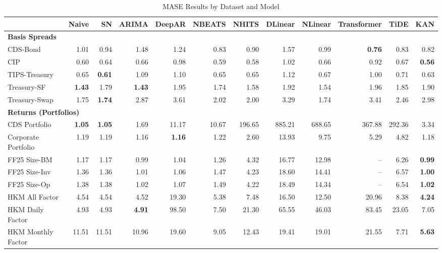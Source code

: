
\begin{table}[htbp]
\centering
\caption{MASE Results by Dataset and Model}
\label{tab:mase_results}
\scriptsize
\setlength{\tabcolsep}{1.5pt}
\renewcommand{\arraystretch}{0.9}
\begin{tabular}{@{}lrrrrrrrrrrr@{}}
\toprule
 & Naive & SN & ARIMA & DeepAR & NBEATS & NHITS & DLinear & NLinear & Transformer & TiDE & KAN \\
\midrule
\multicolumn{12}{l}{\textbf{Basis Spreads}} \\
CDS-Bond & 1.01 & 0.94 & 1.48 & 1.24 & 0.83 & 0.90 & 1.57 & 0.99 & \textbf{0.76} & 0.83 & 0.82 \\
CIP & 0.60 & 0.64 & 0.66 & 0.98 & 0.59 & 0.58 & 1.02 & 0.66 & 0.92 & 0.67 & \textbf{0.56} \\
TIPS-Treasury & 0.65 & \textbf{0.61} & 1.09 & 1.10 & 0.65 & 0.65 & 1.12 & 0.67 & 1.00 & 0.71 & 0.63 \\
Treasury-SF & \textbf{1.43} & 1.79 & \textbf{1.43} & 1.95 & 1.74 & 1.58 & 1.92 & 1.54 & 1.96 & 1.85 & 1.90 \\
Treasury-Swap & 1.75 & \textbf{1.74} & 2.87 & 3.61 & 2.02 & 2.00 & 3.29 & 1.74 & 3.41 & 2.46 & 2.98 \\
\midrule
\multicolumn{12}{l}{\textbf{Returns (Portfolios)}} \\
CDS Portfolio & \textbf{1.05} & \textbf{1.05} & 1.69 & 11.17 & 10.67 & 196.65 & 885.21 & 688.65 & 367.88 & 292.36 & 3.34 \\
Corporate Portfolio & 1.19 & 1.19 & 1.16 & \textbf{1.16} & 1.22 & 2.60 & 13.93 & 9.75 & 5.29 & 4.82 & 1.18 \\
FF25 Size-BM & 1.17 & 1.17 & 0.99 & 1.04 & 1.26 & 4.32 & 16.77 & 12.98 & -- & 6.26 & \textbf{0.99} \\
FF25 Size-Inv & 1.36 & 1.36 & 1.01 & 1.06 & 1.47 & 4.23 & 18.60 & 14.41 & -- & 6.57 & \textbf{1.00} \\
FF25 Size-Op & 1.38 & 1.38 & 1.02 & 1.07 & 1.49 & 4.22 & 18.49 & 14.34 & -- & 6.54 & \textbf{1.02} \\
HKM All Factor & 4.54 & 4.54 & 4.52 & 19.30 & 5.38 & 7.48 & 16.50 & 12.50 & 20.96 & 8.38 & \textbf{4.24} \\
HKM Daily Factor & 4.93 & 4.93 & \textbf{4.91} & 98.50 & 7.50 & 21.30 & 65.55 & 46.03 & 83.45 & 23.05 & 7.05 \\
HKM Monthly Factor & 11.51 & 11.51 & 10.96 & 19.60 & 9.05 & 12.43 & 19.41 & 19.01 & 21.55 & 7.71 & \textbf{5.63} \\

\end{tabular}
\end{table}
